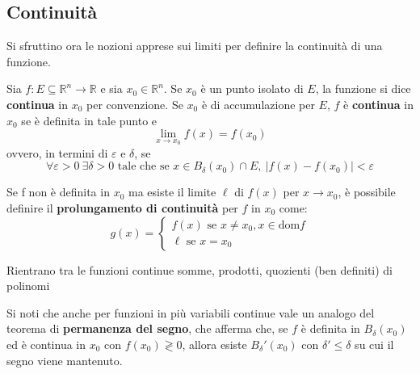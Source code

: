 \subsection{Continuità}
Si sfruttino ora le nozioni apprese sui limiti per definire la continuità di una funzione.
\begin{definition} \label{Def: Continuità}
    Sia $f: E \subseteq \mathbb{R}^n \to \mathbb{R}$ e sia $x_0 \in \mathbb{R}^n$. Se $x_0$ è un punto isolato di $E$, la funzione si dice \textbf{continua} in $x_0$ per convenzione. Se $x_0$ è di accumulazione per $E$, $f$ è \textbf{continua} in $x_0$ se è definita in tale punto e
    \begin{equation} \label{Eq: Continuità}
        \lim_{x \to x_0} f(x)= f(x_0)
    \end{equation}
    ovvero, in termini di $\varepsilon$ e $\delta$, se
    \begin{equation*}
        \forall \varepsilon > 0 \  \exists \delta>0 \text{ tale che se } x \in B_\delta(x_0) \cap E, \ |f(x)-f(x_0)|< \varepsilon
    \end{equation*}
    \end{definition}
    \begin{oss}
        Se f non è definita in $x_0$ ma esiste il limite $\ell$ di $f(x)$ per $x \to x_0$, è possibile definire il \textbf{prolungamento di continuità} per $f$ in $x_0$ come:
        \begin{equation*}
            g(x) = \begin{cases}
                f(x) \text{ se } x \neq x_0, x \in \text{dom}f\\
                \ell \text { se } x=x_0
            \end{cases}
        \end{equation*}
    \end{oss}
    \begin{oss}
        Rientrano tra le funzioni continue somme, prodotti, quozienti (ben definiti) di polinomi
    \end{oss}
\vspace*{\baselineskip}
Si noti che anche per funzioni in più variabili continue vale un analogo del teorema di \textbf{permanenza del segno}, che afferma che, se $f$ è definita in $B_\delta(x_0)$ ed è continua in $x_0$ con $f(x_0) \gtrless 0$, allora esiste $B_\delta'(x_0)$ con $\delta' \leq \delta$ su cui il segno viene mantenuto.

